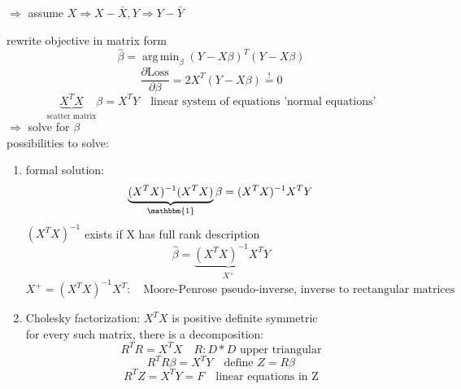 \documentclass[11pt]{article}
\DeclareMathOperator*{\argmin}{arg\,min}
\begin{document}
\begin{itemize}
\begin{itemize}
\begin{itemize}
        \end{itemize}
        $\Rightarrow$ assume $X \Rightarrow X-\bar{X}, Y \Rightarrow Y-\bar{Y}$
      \end{itemize}
      rewrite objective in matrix form
      \begin{equation*}
        \hat{\beta} = \argmin_{\beta}(Y-X\beta)^T(Y-X\beta)
      \end{equation*}
      \begin{equation*}
        \frac{\partial \text{Loss}}{\partial \beta} = 2X^T(Y-X\beta) \overset{!}{=}0
      \end{equation*}
      \begin{equation*}
        \underbrace{X^TX}_{\text{scatter matrix}}\beta = X^TY \quad \text{linear system of equations 'normal equations'}
      \end{equation*}
      $\Rightarrow$ solve for $\beta$ \\
      possibilities to solve:
      \begin{enumerate}
        \item formal solution:
        \begin{equation*}
          \underbrace{(X^TX)^{-1}(X^TX)}_{\mathbbm{1}}\beta = (X^TX)^{-1}X^TY
        \end{equation*}
        $(X^TX)^{-1}$ exists if X has full rank description
        \begin{equation*}
          \hat{\beta}= \underbrace{(X^TX)^{-1}X^T}_{X^+}Y
        \end{equation*}
        \begin{equation*}
          X^+ = (X^TX)^{-1}X^T: \quad \text{Moore-Penrose pseudo-inverse, inverse to rectangular matrices}
        \end{equation*}
        \item Cholesky factorization: $X^TX$ is positive definite symmetric \\
        for every such matrix, there is a decomposition:
        \begin{equation*}
          R^TR=X^TX \quad R:D*D \text{ upper triangular}
        \end{equation*}
        \begin{equation*}
          R^TR\beta = X^TY \quad \text{define } Z=R\beta
        \end{equation*}
        \begin{equation*}
          R^TZ=X^TY=F\quad \text{linear equations in Z}
        \end{equation*}

\end{enumerate}
\end{itemize}
\end{document}
